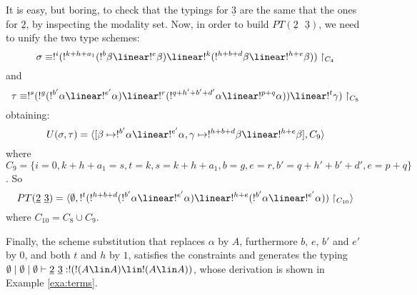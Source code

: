 \begin{exa}
  It is easy, but boring, to check that the typings for
  $\underline{3}$ are the same that the ones for $\underline{2}$, by
  inspecting the modality set.  Now, in order to build
  $PT(\underline{2}\mbox{ }\underline{3})$, we need to unify the two
  type schemes:
$$\sigma \equiv !^{i}(!^{k+h+a_{1}}(!^{b }\beta \linear
!^{e}\beta)\linear !^{k}(!^{h+b+d}\beta \linear !^{h+e}
\beta))\restriction_{C_{4}}
$$
  and 
$$\tau \equiv !^{s}(!^{g}(!^{b'}\alpha \linear !^{e'}\alpha) \linear
!^{r}(!^{q+h'+b'+d'} \alpha \linear !^{p+q}\alpha))\linear
!^{t}\gamma)\restriction_{C_{8}}
$$ 
  obtaining:
$$U(\sigma, \tau)=\langle [\beta \mapsto !^{b'}\alpha\linear !^{e'}\alpha, \gamma \mapsto !^{h+b+d}\beta \linear !^{h+e}\beta] , C_{9}  
\rangle
$$
  where $C_{9}=\{ i=0, k+h+a_{1}=s,t=k,s=k+h+a_{1},b=g, e=r,
  b'=q+h'+b'+d',e=p+q \}$. So
$$PT(\underline{2}\mbox{ }\underline{3})=\langle \emptyset, !^{t}(!^{h+b+d}(!^{b'}\alpha \linear !^{e'}\alpha)\linear !^{h+e}(!^{b'}\alpha
\linear !^{e'}\alpha))\restriction_{C_{10}}  \rangle
$$
  where $C_{10}= C_{8}\cup C_{9}$.

  Finally, the scheme substitution that replaces $\alpha$ by $A$,
  furthermore $b$, $e$, $b'$ and $e'$ by $0$, and both $t$ and
  $h$ by $1$, satisfies the constraints and generates the typing
  $\emptyset \mid \emptyset \mid \emptyset \vdash\underline{2}\mbox{ }
  \underline{3}:!(!(A\lin A)\lin!(A \lin A))$, whose derivation is
  shown in Example \ref{exa:terms}.
\end{exa}

